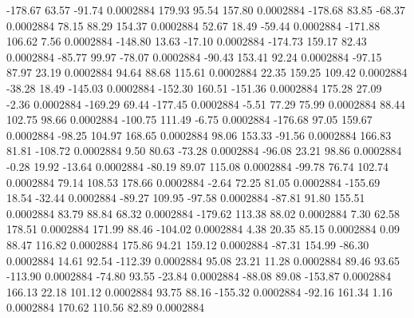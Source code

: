      -178.67       63.57      -91.74     0.0002884
      179.93       95.54      157.80     0.0002884
     -178.68       83.85      -68.37     0.0002884
       78.15       88.29      154.37     0.0002884
       52.67       18.49      -59.44     0.0002884
     -171.88      106.62        7.56     0.0002884
     -148.80       13.63      -17.10     0.0002884
     -174.73      159.17       82.43     0.0002884
      -85.77       99.97      -78.07     0.0002884
      -90.43      153.41       92.24     0.0002884
      -97.15       87.97       23.19     0.0002884
       94.64       88.68      115.61     0.0002884
       22.35      159.25      109.42     0.0002884
      -38.28       18.49     -145.03     0.0002884
     -152.30      160.51     -151.36     0.0002884
      175.28       27.09       -2.36     0.0002884
     -169.29       69.44     -177.45     0.0002884
       -5.51       77.29       75.99     0.0002884
       88.44      102.75       98.66     0.0002884
     -100.75      111.49       -6.75     0.0002884
     -176.68       97.05      159.67     0.0002884
      -98.25      104.97      168.65     0.0002884
       98.06      153.33      -91.56     0.0002884
      166.83       81.81     -108.72     0.0002884
        9.50       80.63      -73.28     0.0002884
      -96.08       23.21       98.86     0.0002884
       -0.28       19.92      -13.64     0.0002884
      -80.19       89.07      115.08     0.0002884
      -99.78       76.74      102.74     0.0002884
       79.14      108.53      178.66     0.0002884
       -2.64       72.25       81.05     0.0002884
     -155.69       18.54      -32.44     0.0002884
      -89.27      109.95      -97.58     0.0002884
      -87.81       91.80      155.51     0.0002884
       83.79       88.84       68.32     0.0002884
     -179.62      113.38       88.02     0.0002884
        7.30       62.58      178.51     0.0002884
      171.99       88.46     -104.02     0.0002884
        4.38       20.35       85.15     0.0002884
        0.09       88.47      116.82     0.0002884
      175.86       94.21      159.12     0.0002884
      -87.31      154.99      -86.30     0.0002884
       14.61       92.54     -112.39     0.0002884
       95.08       23.21       11.28     0.0002884
       89.46       93.65     -113.90     0.0002884
      -74.80       93.55      -23.84     0.0002884
      -88.08       89.08     -153.87     0.0002884
      166.13       22.18      101.12     0.0002884
       93.75       88.16     -155.32     0.0002884
      -92.16      161.34        1.16     0.0002884
      170.62      110.56       82.89     0.0002884
